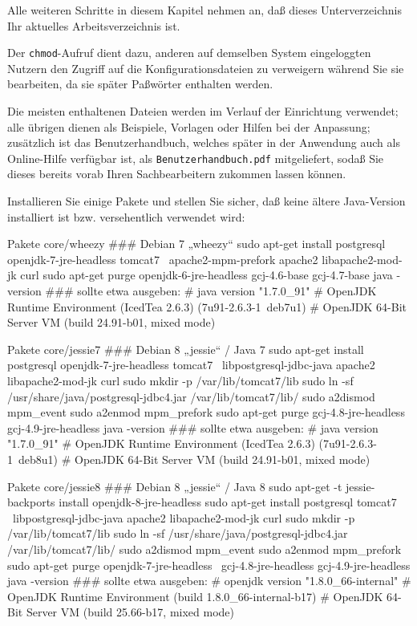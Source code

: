 Alle weiteren Schritte in diesem Kapitel nehmen an, daß dieses
Unterverzeichnis Ihr aktuelles Arbeitsverzeichnis ist.

Der \texttt{chmod}-Aufruf dient dazu, anderen auf demselben System
eingeloggten Nutzern den Zugriff auf die Konfigurationsdateien zu
verweigern während Sie sie bearbeiten, da sie später Paßwörter
enthalten werden.

Die meisten enthaltenen Dateien werden im Verlauf der Einrichtung
verwendet; alle übrigen dienen als Beispiele, Vorlagen oder Hilfen
bei der Anpassung; zusätzlich ist das Benutzerhandbuch, welches
später in der Anwendung auch als Online-Hilfe verfügbar ist, als
\texttt{Benutzerhandbuch.pdf} mitgeliefert, sodaß Sie dieses bereits
vorab Ihren Sachbearbeitern zukommen lassen können.

\begin{minipage}{\textwidth}
Installieren Sie einige Pakete und stellen Sie sicher, daß keine
ältere Java-Version installiert ist bzw. versehentlich verwendet wird:

\begin{lstdump}{Pakete core/wheezy}
### Debian 7 „wheezy“
sudo apt-get install postgresql openjdk-7-jre-headless tomcat7 \
    apache2-mpm-prefork apache2 libapache2-mod-jk curl
sudo apt-get purge openjdk-6-jre-headless gcj-4.6-base gcj-4.7-base
java -version
### sollte etwa ausgeben:
# java version "1.7.0_91"
# OpenJDK Runtime Environment (IcedTea 2.6.3) (7u91-2.6.3-1~deb7u1)
# OpenJDK 64-Bit Server VM (build 24.91-b01, mixed mode)
\end{lstdump}

\begin{lstdump}{Pakete core/jessie7}
### Debian 8 „jessie“ / Java 7
sudo apt-get install postgresql openjdk-7-jre-headless tomcat7 \
    libpostgresql-jdbc-java apache2 libapache2-mod-jk curl
sudo mkdir -p /var/lib/tomcat7/lib
sudo ln -sf /usr/share/java/postgresql-jdbc4.jar /var/lib/tomcat7/lib/
sudo a2dismod mpm_event
sudo a2enmod mpm_prefork
sudo apt-get purge gcj-4.8-jre-headless gcj-4.9-jre-headless
java -version
### sollte etwa ausgeben:
# java version "1.7.0_91"
# OpenJDK Runtime Environment (IcedTea 2.6.3) (7u91-2.6.3-1~deb8u1)
# OpenJDK 64-Bit Server VM (build 24.91-b01, mixed mode)
\end{lstdump}

\begin{lstdump}{Pakete core/jessie8}
### Debian 8 „jessie“ / Java 8
sudo apt-get -t jessie-backports install openjdk-8-jre-headless
sudo apt-get install postgresql tomcat7 \
    libpostgresql-jdbc-java apache2 libapache2-mod-jk curl
sudo mkdir -p /var/lib/tomcat7/lib
sudo ln -sf /usr/share/java/postgresql-jdbc4.jar /var/lib/tomcat7/lib/
sudo a2dismod mpm_event
sudo a2enmod mpm_prefork
sudo apt-get purge openjdk-7-jre-headless \
    gcj-4.8-jre-headless gcj-4.9-jre-headless
java -version
### sollte etwa ausgeben:
# openjdk version "1.8.0_66-internal"
# OpenJDK Runtime Environment (build 1.8.0_66-internal-b17)
# OpenJDK 64-Bit Server VM (build 25.66-b17, mixed mode)
\end{lstdump}
\end{minipage}

